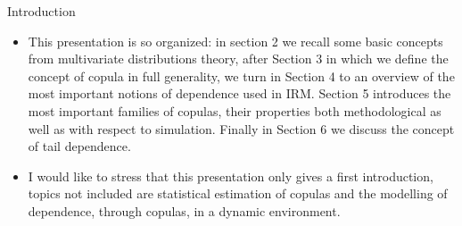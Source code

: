 \documentclass[11pt]{beamer}
\theoremstyle{plain}
\theoremstyle{definition}
\theoremstyle{remark}
\begin{document}
%
\begin{frame}{Introduction}
		\begin{itemize}
		\item This presentation is so organized: 
		in section 2 we recall some basic concepts from multivariate distributions theory, after Section 3 in which we define 
		the concept of copula in full generality, we turn in Section 4 to an overview of the most important notions of 
		dependence used in IRM. Section 5 introduces the most important families of copulas, their properties both 
		methodological as well as with respect to simulation. Finally in Section 6 we discuss the concept of tail dependence.
		\item
		I would like to stress that this presentation only gives a first introduction, topics not included are statistical 
		estimation of copulas and the modelling of dependence, through copulas, in a dynamic environment.
		\end{itemize}
\end{frame}
%
\end{document}
